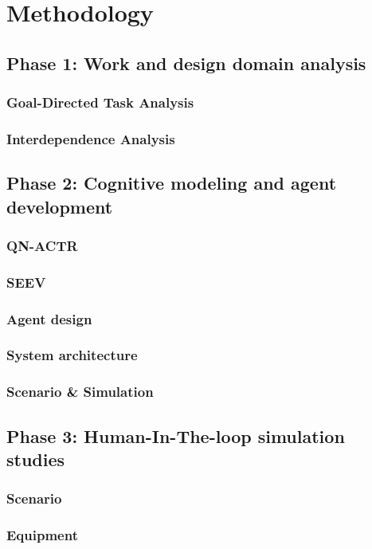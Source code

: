 \documentclass[12pt,a4paper]{article} %
\begin{document}
	\section{Methodology} %
	\subsection{Phase 1: Work and design domain analysis}
	\subsubsection{Goal-Directed Task Analysis}
	\subsubsection{Interdependence Analysis}
	\subsection{Phase 2: Cognitive modeling and agent development}
	\subsubsection{QN-ACTR}
	\subsubsection{SEEV}
	\subsubsection{Agent design}
	\subsubsection{System architecture}
	\subsubsection{Scenario \& Simulation}
	\subsection{Phase 3: Human-In-The-loop simulation studies}
	\subsubsection{Scenario}
	\subsubsection{Equipment}
\end{document}
